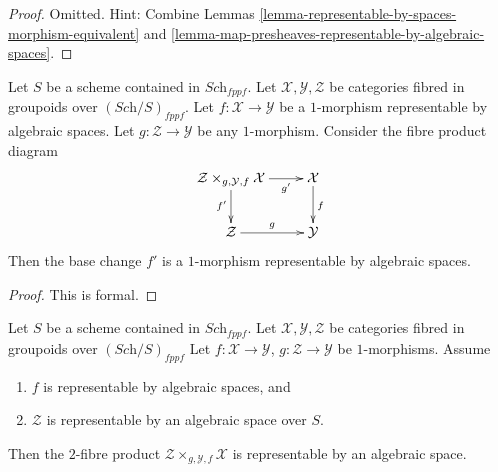 \begin{proof}
Omitted. Hint: Combine
Lemmas \ref{lemma-representable-by-spaces-morphism-equivalent}
and \ref{lemma-map-presheaves-representable-by-algebraic-spaces}.
\end{proof}


\begin{lemma}
\label{lemma-base-change-representable-by-spaces}
Let $S$ be a scheme contained in $\textit{Sch}_{fppf}$.
Let $\mathcal{X}, \mathcal{Y}, \mathcal{Z}$
be categories fibred in groupoids over $(\textit{Sch}/S)_{fppf}$.
Let $f : \mathcal{X} \to \mathcal{Y}$ be a $1$-morphism
representable by algebraic spaces.
Let $g : \mathcal{Z} \to \mathcal{Y}$ be any $1$-morphism.
Consider the fibre product diagram
$$
\xymatrix{
\mathcal{Z} \times_{g, \mathcal{Y}, f} \mathcal{X} \ar[r]_-{g'} \ar[d]_{f'} &
\mathcal{X} \ar[d]^f \\
\mathcal{Z} \ar[r]^g & \mathcal{Y}
}
$$
Then the base change $f'$ is a $1$-morphism representable by
algebraic spaces.
\end{lemma}

\begin{proof}
This is formal.
\end{proof}

\begin{lemma}
\label{lemma-base-change-by-space-representable-by-space}
Let $S$ be a scheme contained in $\textit{Sch}_{fppf}$.
Let $\mathcal{X}, \mathcal{Y}, \mathcal{Z}$
be categories fibred in groupoids over $(\textit{Sch}/S)_{fppf}$
Let $f : \mathcal{X} \to \mathcal{Y}$,
$g : \mathcal{Z} \to \mathcal{Y}$ be $1$-morphisms.
Assume
\begin{enumerate}
\item $f$ is representable by algebraic spaces, and
\item $\mathcal{Z}$ is representable by an algebraic space over $S$.
\end{enumerate}
Then the $2$-fibre product
$\mathcal{Z} \times_{g, \mathcal{Y}, f} \mathcal{X}$
is representable by an algebraic space.
\end{lemma}

